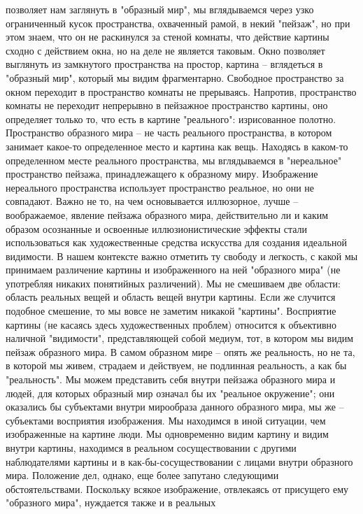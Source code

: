 \documentclass[12pt]{article}
\begin{document}
позволяет нам заглянуть в "образный мир", мы вглядываемся через узко ограниченный кусок пространства,
охваченный рамой, в некий "пейзаж", но при этом знаем, что он не раскинулся за стеной комнаты, что действие
картины сходно с действием окна, но на деле не является таковым. Окно позволяет выглянуть из замкнутого
пространства на простор, картина -- вглядеться в "образный мир", который мы видим фрагментарно. Свободное
пространство за окном переходит в пространство комнаты не прерываясь. Напротив, пространство комнаты не
переходит  непрерывно  в  пейзажное  пространство  картины,  оно  определяет  только  то,  что  есть  в  картине
"реального":  изрисованное  полотно.  Пространство  образного  мира  --  не  часть  реального  пространства,  в
котором занимает какое-то определенное место и картина как вещь. Находясь в каком-то определенном месте
реального пространства, мы вглядываемся в "нереальное" пространство пейзажа, принадлежащего к образному
миру. Изображение нереального пространства использует пространство реальное, но они не совпадают. Важно
не  то,  на  чем  основывается  иллюзорное,  лучше  --  воображаемое,  явление  пейзажа  образного  мира,
действительно  ли  и  каким  образом  осознанные  и  освоенные  иллюзионистические  эффекты  стали
использоваться как художественные средства искусства для создания идеальной видимости. В нашем контексте
важно отметить ту свободу и легкость, с какой мы принимаем различение картины и изображенного на ней
"образного мира" (не употребляя никаких понятийных различений). Мы не смешиваем две области: область
реальных вещей и область вещей внутри картины. Если же случится подобное смешение, то мы вовсе не
заметим никакой "картины". Восприятие картины (не касаясь здесь художественных проблем) относится к
объективно наличной "видимости", представляющей собой медиум, тот, в котором мы видим пейзаж образного
мира. В самом образном мире -- опять же реальность, но не та, в которой мы живем, страдаем и действуем, не
подлинная реальность, а как бы "реальность". Мы можем представить себя внутри пейзажа образного мира и
людей, для которых образный мир означал бы их "реальное окружение"; они оказались бы субъектами внутри
мирообраза данного образного мира, мы же -- субъектами восприятия изображения. Мы находимся в иной
ситуации, чем изображенные на картине люди. Мы одновременно видим картину и видим внутри картины,
находимся в реальном сосуществовании с другими наблюдателями картины и в как-бы-сосуществовании с
лицами внутри образного мира. Положение дел, однако, еще более запутано следующими обстоятельствами.
Поскольку всякое изображение, отвлекаясь от присущего ему "образного мира", нуждается также и в реальных
\end{document}
